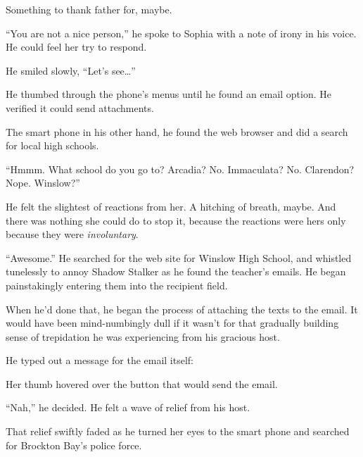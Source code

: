 Something to thank father for, maybe.



``You are not a nice person,'' he spoke to Sophia with a note of irony in his voice.  He could feel her try to respond.



He smiled slowly, ``Let's see\ldots''



He thumbed through the phone's menus until he found an email option.  He verified it could send attachments.



The smart phone in his other hand, he found the web browser and did a search for local high schools.



``Hmmm.  What school do you go to?  Arcadia?  No.  Immaculata?  No.  Clarendon?  Nope.  Winslow?''



He felt the slightest of reactions from her.  A hitching of breath, maybe.  And there was nothing she could do to stop it, because the reactions were hers only because they were \emph{involuntary}.



``Awesome.''  He searched for the web site for Winslow High School, and whistled tunelessly to annoy Shadow Stalker as he found the teacher's emails.  He began painstakingly entering them into the recipient field.



When he'd done that, he began the process of attaching the texts to the email.  It would have been mind-numbingly dull if it wasn't for that gradually building sense of trepidation he was experiencing from his gracious host.



He typed out a message for the email itself:





Her thumb hovered over the button that would send the email.



``Nah,'' he decided.  He felt a wave of relief from his host.



That relief swiftly faded as he turned her eyes to the smart phone and searched for Brockton Bay's police force.



